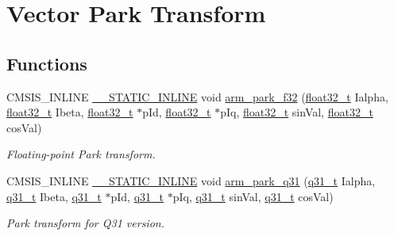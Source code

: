 \hypertarget{group__park}{}\section{Vector Park Transform}
\label{group__park}
\subsection*{Functions}
\begin{DoxyCompactItemize}
\item 
C\+M\+S\+I\+S\+\_\+\+I\+N\+L\+I\+NE \mbox{\hyperlink{cmsis__iccarm_8h_aba87361bfad2ae52cfe2f40c1a1dbf9c}{\+\_\+\+\_\+\+S\+T\+A\+T\+I\+C\+\_\+\+I\+N\+L\+I\+NE}} void \mbox{\hyperlink{group__park_gae24bf07174d3b8dddcf30d8c8d8e7fbb}{arm\+\_\+park\+\_\+f32}} (\mbox{\hyperlink{arm__math_8h_a4611b605e45ab401f02cab15c5e38715}{float32\+\_\+t}} Ialpha, \mbox{\hyperlink{arm__math_8h_a4611b605e45ab401f02cab15c5e38715}{float32\+\_\+t}} Ibeta, \mbox{\hyperlink{arm__math_8h_a4611b605e45ab401f02cab15c5e38715}{float32\+\_\+t}} $\ast$p\+Id, \mbox{\hyperlink{arm__math_8h_a4611b605e45ab401f02cab15c5e38715}{float32\+\_\+t}} $\ast$p\+Iq, \mbox{\hyperlink{arm__math_8h_a4611b605e45ab401f02cab15c5e38715}{float32\+\_\+t}} sin\+Val, \mbox{\hyperlink{arm__math_8h_a4611b605e45ab401f02cab15c5e38715}{float32\+\_\+t}} cos\+Val)
\begin{DoxyCompactList}\small\item\em Floating-\/point Park transform. \end{DoxyCompactList}\item 
C\+M\+S\+I\+S\+\_\+\+I\+N\+L\+I\+NE \mbox{\hyperlink{cmsis__iccarm_8h_aba87361bfad2ae52cfe2f40c1a1dbf9c}{\+\_\+\+\_\+\+S\+T\+A\+T\+I\+C\+\_\+\+I\+N\+L\+I\+NE}} void \mbox{\hyperlink{group__park_ga5630ed3715091f2795ee10df34672523}{arm\+\_\+park\+\_\+q31}} (\mbox{\hyperlink{arm__math_8h_adc89a3547f5324b7b3b95adec3806bc0}{q31\+\_\+t}} Ialpha, \mbox{\hyperlink{arm__math_8h_adc89a3547f5324b7b3b95adec3806bc0}{q31\+\_\+t}} Ibeta, \mbox{\hyperlink{arm__math_8h_adc89a3547f5324b7b3b95adec3806bc0}{q31\+\_\+t}} $\ast$p\+Id, \mbox{\hyperlink{arm__math_8h_adc89a3547f5324b7b3b95adec3806bc0}{q31\+\_\+t}} $\ast$p\+Iq, \mbox{\hyperlink{arm__math_8h_adc89a3547f5324b7b3b95adec3806bc0}{q31\+\_\+t}} sin\+Val, \mbox{\hyperlink{arm__math_8h_adc89a3547f5324b7b3b95adec3806bc0}{q31\+\_\+t}} cos\+Val)
\begin{DoxyCompactList}\small\item\em Park transform for Q31 version. \end{DoxyCompactList}\end{DoxyCompactItemize}


